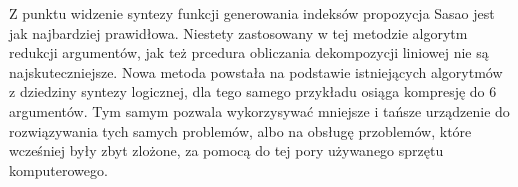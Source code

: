 Z punktu widzenie syntezy funkcji generowania indeksów propozycja Sasao jest jak najbardziej prawidłowa.
Niestety zastosowany w tej metodzie algorytm redukcji argumentów,
jak też prcedura obliczania dekompozycji liniowej nie są najskuteczniejsze.
Nowa metoda powstała na podstawie istniejących algorytmów z dziedziny syntezy logicznej,
dla tego samego przykładu osiąga kompresję do 6 argumentów.
Tym samym pozwala wykorzysywać mniejsze i tańsze urządzenie do rozwiązywania tych samych problemów,
albo na obsługę przoblemów, które wcześniej były zbyt zlożone,
za pomocą do tej pory używanego sprzętu komputerowego.






